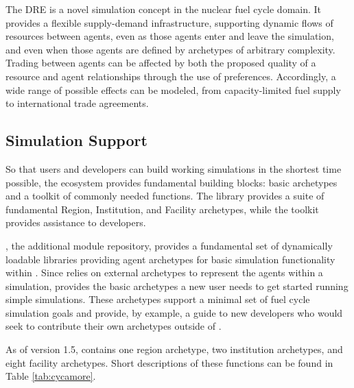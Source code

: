 The \gls{DRE} is a novel simulation concept in the nuclear fuel cycle domain. It
provides a flexible supply-demand infrastructure, supporting dynamic flows of
resources between agents, even as those agents enter and leave the simulation, and
even when those agents are defined by archetypes of arbitrary complexity. Trading
between agents can be affected by both the
proposed quality of a resource and agent relationships through the use of
preferences. Accordingly, a wide range of possible effects can be
modeled, from capacity-limited fuel supply to international trade agreements.

\subsection{Simulation Support}
So that users and developers can build working simulations in the shortest time
possible, the \Cyclus ecosystem provides fundamental building blocks: basic
archetypes and a toolkit of commonly needed functions.  The \Cycamore library
provides a suite of fundamental Region, Institution, and Facility archetypes,
while the \Cyclus toolkit provides assistance to developers.

\Cycamore {}, the \Cyclus additional module
repository, provides a fundamental set of dynamically loadable libraries
providing agent archetypes for basic simulation
functionality within \Cyclus.  Since \Cyclus relies on external
archetypes to represent the agents within a simulation, \Cycamore provides the
basic archetypes a new user needs to get started running simple simulations.
These archetypes support a minimal set of fuel cycle simulation goals and
provide, by example, a guide to new developers who would seek to contribute
their own archetypes outside of \Cycamore.

As of version 1.5, \Cycamore contains one region archetype, two institution
archetypes, and eight facility archetypes. Short descriptions of these functions can be found in
Table \ref{tab:cycamore}.

